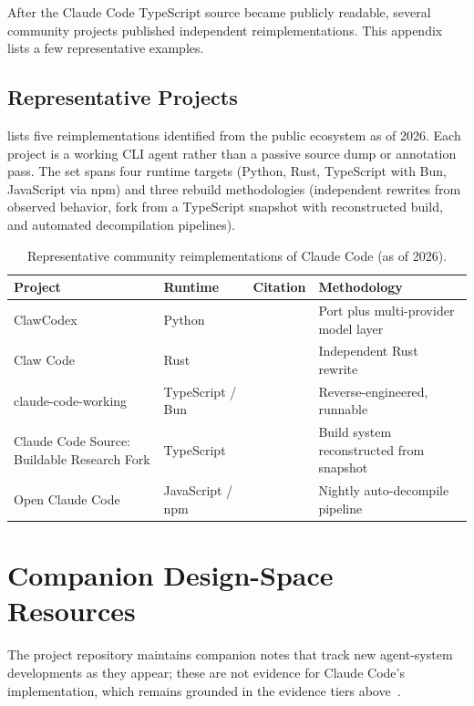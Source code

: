After the Claude Code TypeScript source became publicly readable, several community projects published independent reimplementations. This appendix lists a few representative examples.

\subsection*{Representative Projects}
\label{sec:appendix:community:list}

 lists five reimplementations identified from the public ecosystem as of 2026. Each project is a working CLI agent rather than a passive source dump or annotation pass. The set spans four runtime targets (Python, Rust, TypeScript with Bun, JavaScript via npm) and three rebuild methodologies (independent rewrites from observed behavior, fork from a TypeScript snapshot with reconstructed build, and automated decompilation pipelines).

\begin{table}[h]
\centering
\caption{Representative community reimplementations of Claude Code (as of 2026).}
\label{tab:reimplementations}
\small
\begin{tabularx}{\columnwidth}{lll>{\raggedright\arraybackslash}X}
\toprule
\textbf{Project} & \textbf{Runtime} & \textbf{Citation} & \textbf{Methodology} \\
\midrule
ClawCodex & Python & \citep{clawcodex2026} & Port plus multi-provider model layer \\
\addlinespace
Claw Code & Rust & \citep{clawcoderust2026} & Independent Rust rewrite \\
\addlinespace
claude-code-working & TypeScript / Bun & \citep{claudecodeworking2026} & Reverse-engineered, runnable \\
\addlinespace
Claude Code Source: Buildable Research Fork & TypeScript & \citep{tlabclaude2026} & Build system reconstructed from snapshot \\
\addlinespace
Open Claude Code & JavaScript / npm & \citep{openclaudecode2026} & Nightly auto-decompile pipeline \\
\bottomrule
\end{tabularx}
\end{table}

\section*{Companion Design-Space Resources}
\label{sec:appendix:community:resources}

The project repository maintains companion notes that track new agent-system developments as they appear; these are not evidence for Claude Code's implementation, which remains grounded in the evidence tiers above~\citep{vilalab2026designnotes}.
